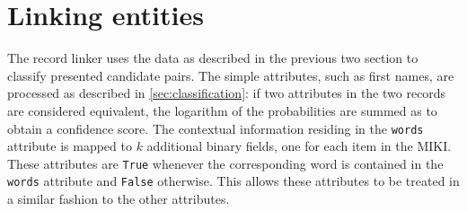 

\section{Linking entities}
\label{sec:linking_entities}

The record linker uses the data as described in the previous two section to classify presented candidate pairs.
The simple attributes, such as first names, are processed as described in \cref{sec:classification}: if two attributes in the two records are considered equivalent, the logarithm of the probabilities are summed as to obtain a confidence score.
The contextual information residing in the \texttt{words} attribute is mapped to $k$ additional binary fields, one for each item in the MIKI.
These attributes are \texttt{True} whenever the corresponding word is contained in the \texttt{words} attribute and \texttt{False} otherwise.
This allows these attributes to be treated in a similar fashion to the other attributes.